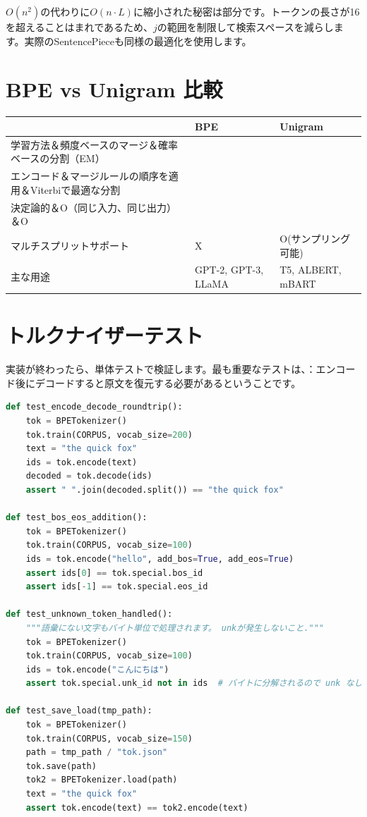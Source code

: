 \begin{infobox}[Viterbiの複雑さ]
$O(n^2)$の代わりに$O(n \cdot L)$に縮小された秘密は部分です。トークンの長さが16を超えることはまれであるため、$j$の範囲を制限して検索スペースを減らします。実際のSentencePieceも同様の最適化を使用します。
\end{infobox}

\section{BPE vs Unigram 比較}

\begin{center}
\begin{tabularx}{\textwidth}{lXX}
\toprule
 & \textbf{BPE} & \textbf{Unigram} \\
\midrule
学習方法＆頻度ベースのマージ＆確率ベースの分割（EM）\\
エンコード＆マージルールの順序を適用＆Viterbiで最適な分割\\
決定論的＆O（同じ入力、同じ出力）＆O \\
マルチスプリットサポート&X&O(サンプリング可能) \\
主な用途 & GPT-2, GPT-3, LLaMA & T5, ALBERT, mBART \\
\bottomrule
\end{tabularx}
\end{center}

\section{トルクナイザーテスト}

実装が終わったら、単体テストで検証します。最も重要なテストは、：エンコード後にデコードすると原文を復元する必要があるということです。

\begin{lstlisting}[language=Python]
def test_encode_decode_roundtrip():
    tok = BPETokenizer()
    tok.train(CORPUS, vocab_size=200)
    text = "the quick fox"
    ids = tok.encode(text)
    decoded = tok.decode(ids)
    assert " ".join(decoded.split()) == "the quick fox"

def test_bos_eos_addition():
    tok = BPETokenizer()
    tok.train(CORPUS, vocab_size=100)
    ids = tok.encode("hello", add_bos=True, add_eos=True)
    assert ids[0] == tok.special.bos_id
    assert ids[-1] == tok.special.eos_id

def test_unknown_token_handled():
    """語彙にない文字もバイト単位で処理されます。 unkが発生しないこと."""
    tok = BPETokenizer()
    tok.train(CORPUS, vocab_size=100)
    ids = tok.encode("こんにちは")
    assert tok.special.unk_id not in ids  # バイトに分解されるので unk なし

def test_save_load(tmp_path):
    tok = BPETokenizer()
    tok.train(CORPUS, vocab_size=150)
    path = tmp_path / "tok.json"
    tok.save(path)
    tok2 = BPETokenizer.load(path)
    text = "the quick fox"
    assert tok.encode(text) == tok2.encode(text)
\end{lstlisting}

